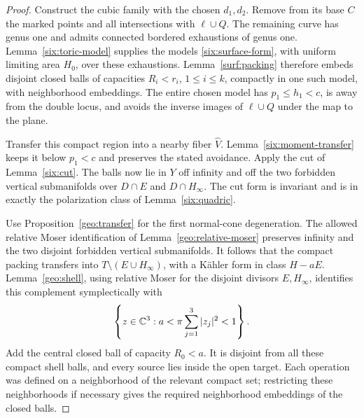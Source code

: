 \begin{proof}
Construct the cubic family with the chosen \(d_1,d_2\).
Remove from its base \(C\) the marked points and all
intersections with \(\ell\cup Q\).  The remaining curve
has genus one and admits connected bordered exhaustions
of genus one.  Lemma~\ref{six:toric-model} supplies the
models \eqref{six:surface-form}, with uniform limiting
area \(H_0\), over these exhaustions.
Lemma~\ref{surf:packing} therefore embeds disjoint closed
balls of capacities \(R_i<r_i\), \(1\le i\le k\), compactly
in one such model, with neighborhood embeddings.
The entire chosen model has \(p_1\le h_1<c\), is away
from the double locus, and avoids the inverse images
of \(\ell\cup Q\) under the map to the plane.

Transfer this compact region into a nearby fiber
\(\widehat V\).  Lemma~\ref{six:moment-transfer} keeps it
below \(p_1<c\) and preserves the stated avoidance.
Apply the cut of Lemma~\ref{six:cut}.  The balls now lie
in \(Y\) off infinity and off the two forbidden vertical
submanifolds over \(D\cap E\) and \(D\cap H_\infty\).
The cut form is invariant and is in exactly the
polarization class of Lemma~\ref{six:quadric}.

Use Proposition~\ref{geo:transfer} for the first normal-cone
degeneration.  The allowed relative Moser identification
of Lemma~\ref{geo:relative-moser} preserves infinity and
the two disjoint forbidden vertical submanifolds.
It follows that the compact packing transfers into
\(T\setminus(E\cup H_\infty)\), with a Kähler form in
class \(H-aE\).  Lemma~\ref{geo:shell}, using relative
Moser for the disjoint divisors \(E,H_\infty\), identifies
this complement symplectically with
\[
 \left\{z\in\mathbb C^3:
          a<\pi\sum_{j=1}^3|z_j|^2<1\right\}.
\]
Add the central closed ball of capacity \(R_0<a\).
It is disjoint from all these compact shell balls, and
every source lies inside the open target.  Each operation
was defined on a neighborhood of the relevant compact
set; restricting these neighborhoods if necessary gives
the required neighborhood embeddings of the closed balls.
\end{proof}
